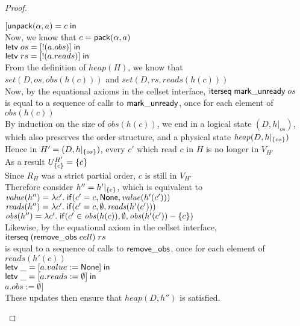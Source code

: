\begin{proof}
\begin{tabbedproof}
\oooo $[\mathsf{unpack}({\alpha}, {a}) = {c} \;\mathsf{in}\;{}$ \\
\oooo Now, we know that $c = \mathsf{pack}({\alpha}, {a})$ \\
\oooo $\mathsf{letv}\;os = [!(a.obs)]\;\mathsf{in}\;$ \\
\oooo $\mathsf{letv}\;rs = [!(a.reads)]\;\mathsf{in}\;$ \\
\oooo From the definition of $\mathit{heap}(H)$, we know that  \\
\oooo $\mathit{set}(D, os, \mathit{obs}(h(c)))$ and $\mathit{set}(D, rs, \mathit{reads}(h(c)))$ \\
\oooo Now, by the equational axioms in the cellset interface, $\mathsf{iterseq\;mark\_unready}\;os$ \\
\ooox is equal to a sequence of calls to $\mathsf{mark\_unready}$, once for each element of $\mathit{obs}(h(c))$\\
\oooo By induction on the size of $\mathit{obs}(h(c))$, we end in a logical state $(D, h|_{os})$, \\
\ooox which also preserves the order structure, and a physical state $\mathit{heap}(D, h|_{\{{os}\}})$  \\
\oooo Hence in $H' = (D,h|_{\{{os}\}})$, every $c'$ which read $c$ in $H$ is no longer in $V_{H'}$ \\ 
\oooo As a result $U^{H'}_{\{{c}\}} = \{{c}\}$ \\ 
\oooo Since $R_H$ was a strict partial order, $c$ is still in $V_{H'}$ \\
\oooo Therefore consider $h'' = h'|_{\{{c}\}}$, which is equivalent to   \\
\oooox $\mathit{value}(h'') = \lambda c'.\;\mathsf{if}({c' = c}, {\mathsf{None}}, {\mathit{value}(h'(c'))})$ \\
\oooox $\mathit{reads}(h'') = \lambda c'.\;\mathsf{if}({c' = c}, {\emptyset}, {\mathit{reads}(h'(c'))})$ \\
\oooox $\mathit{obs}(h'') = \lambda c'.\;\mathsf{if}({c'\in \mathit{obs}(h(c))}, {\emptyset}, {\mathit{obs}(h'(c')) - \{{c}\}})$ \\
\oooo Likewise, by the equational axiom in the cellset interface, $\mathsf{iterseq}\;(\mathsf{remove\_obs}\;cell)\;rs$ \\
\ooox is equal to a sequence of calls to $\mathsf{remove\_obs}$, once for each element of $\mathit{reads}(h'(c))$\\
\oooo $\mathsf{letv}\;\_ = [a.value := \mathsf{None}]\;\mathsf{in}\;$ \\
\oooo $\mathsf{letv}\;\_ = [a.reads := \emptyset]\;\mathsf{in}\;$ \\
\oooo $a.obs := \emptyset]$ \\
\oooo These updates then ensure that $\mathit{heap}(D, h'')$ is satisfied. \\
\end{tabbedproof}
\end{proof}

